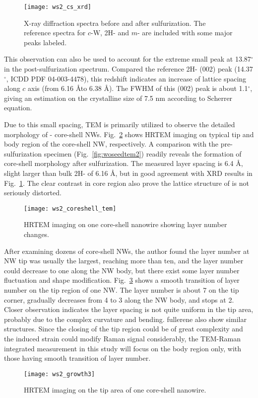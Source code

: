 \begin{figure}[htb]
\centering
\texttt{[image: ws2\_cs\_xrd]}
\caption[XRD on core-shell NWs]{X-ray diffraction spectra before and after sulfurization. The reference spectra for $c$-W, 2H- and $m$- are included with some major peaks labeled.}
\label{fig:ch5ws2xrd}
\end{figure}

This observation can also be used to account for the extreme small peak at 13.87$^{\circ}$ in the post-sulfurization spectrum. Compared the reference 2H- (002) peak (14.37$^{\circ}$, ICDD PDF 04-003-4478), this redshift indicates an increase of lattice spacing along $c$ axis (from 6.16 \AA to 6.38 \AA). The FWHM of this (002) peak is about 1.1$^{\circ}$, giving an estimation on the crystalline size of 7.5 nm according to Scherrer equation. 

Due to this small spacing, TEM is primarily utilized to observe the detailed morphology of - core-shell NWs. Fig.~\ref{fig:ch5ws2tem1} shows HRTEM imaging on typical tip and body region of the core-shell NW, respectively. A comparison with the pre-sulfurization specimen (Fig.~\ref{fig:woseedtem2}) readily reveals the formation of core-shell morphology after sulfurization. The measured layer spacing is 6.4 \AA, slight larger than bulk 2H- of 6.16 \AA, but in good agreement with XRD results in Fig.~\ref{fig:ch5ws2xrd}. The clear contrast in core region also prove the lattice structure of  is not seriously distorted.

\begin{figure}[htb]
\centering
\texttt{[image: ws2\_coreshell\_tem]}
\caption[TEM imaging on core-shell NWs: 1]{HRTEM imaging on one core-shell nanowire showing layer number changes.}
\label{fig:ch5ws2tem1}
\end{figure}

After examining dozens of core-shell NWs, the author found the  layer number at NW tip was usually the largest, reaching more than ten, and the layer number could decrease to one along the NW body, but there exist some layer number fluctuation and shape modification. Fig.~\ref{fig:ch5ws2tem3} shows a smooth transition of  layer number on the tip region of one NW. The layer number is about 7 on the tip corner, gradually decreases from 4 to 3 along the NW body, and stops at 2. Closer observation indicates the layer spacing is not quite uniform in the tip area, probably due to the complex curvature and bending.  fullerene also show similar structures. Since the closing of the tip region could be of great complexity and the induced strain could modify Raman signal considerably, the TEM-Raman integrated measurement in this study will focus on the body region only, with those having smooth transition of layer number.
\begin{figure}[htb]
\centering
\texttt{[image: ws2\_growth3]}
\caption[TEM imaging on core-shell NWs: 2]{HRTEM imaging on the tip area of one core-shell nanowire.}
\label{fig:ch5ws2tem3}
\end{figure}

